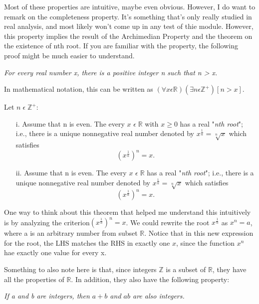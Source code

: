\documentclass[a4paper]{article}
\begin{document}
Most of these properties are intuitive, maybe even obvious. However, I do want to remark on the completeness property. It's something that's only really studied in real analysis, and most likely won't come up in any test of thie module. However, this property implies the result of the Archimedian Property and the theorem on the existence of nth root. If you are familiar with the property, the following proof might be much easier to understand.

\begin{tcolorbox}[title= Archimidean Property]
	\textit{For every real number x, there is a positive integer n such that n > x.}
\end{tcolorbox}
In mathematical notation, this can be written as $\left( \forall x \epsilon \mathbb{R} \right)\left(\exists n \epsilon \mathbb{Z}^+\right)[n > x]$.
\begin{tcolorbox}[title= The existence of \textit{n}th root]
	Let $n \; \epsilon \; \mathbb{Z}^+$:
\begin{itemize}
	\item[i.] Assume that n is even. The every $x$ $\epsilon \; \mathbb{R}$ with $x \ge 0$ has a real "\textit{nth root}"; i.e., there is a unique nonnegative real number denoted by $ x ^ \frac{1}{n} = \sqrt[n]{x}$ which satisfies \[
				\left( x ^ \frac{1}{n}  \right) ^ n = x 
	.\] 
	\item[ii.] Assume that n is even. The every $x$ $\epsilon \; \mathbb{R}$ has a real "\textit{nth root}"; i.e., there is a unique nonnegative real number denoted by $ x ^ \frac{1}{n} = \sqrt[n]{x}$ which satisfies \[
				\left( x ^ \frac{1}{n}  \right) ^ n = x 
	.\] 
	\end{itemize}
\end{tcolorbox}
One way to think about this theorem that helped me understand this intuitively is by analyzing the criterion$\left( x ^ \frac{1}{n}  \right) ^ n = x$. We could rewrite the root $x ^ \frac{1}{n} $ as $ x ^ n = a$, where a is an arbitrary number from subset $\mathbb{R}$. Notice that in this new expression for the root, the LHS matches the RHS in exactly one $x$, since the function  $x^n$ hae exactly one value for every x.

Something to also note here is that, since integers $\mathbb{Z}$ is a subset of $\mathbb{R}$, they have all the properties of $\mathbb{R}$. In addition, they also have the following property: 

\begin{tcolorbox}[title = Closure property of real numbers]
	\textit{If a and b are integers, then $a + b$ and  $ab$ are also integers.}
\end{tcolorbox}
\end{document}
